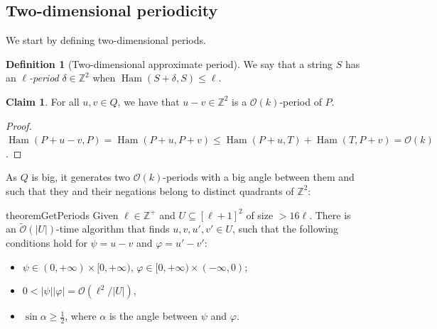\documentclass[11pt, letterpaper]{article}
\theoremstyle{plain}
\theoremstyle{definition}
\newtheorem{definition}{Definition}
\newtheorem{claim}{Claim}
\theoremstyle{remark}
\newcommand{\Z}{\mathbb{Z}}
\renewcommand{\O}{\mathcal{O}}
\newcommand{\tO}{\tilde{\mathcal{O}}}
\renewcommand{\phi}{\varphi}
\DeclareMathOperator*{\Ham}{Ham}
\begin{document}
\subsection{Two-dimensional periodicity} \label{periodicity_section}
We start by defining two-dimensional periods.



\begin{definition}[Two-dimensional approximate period]
We say that a string $S$ has an \emph{$\ell$-period} $\delta \in \Z^2$ when $\Ham(S + \delta, S) \le \ell$.
\end{definition}


\begin{claim} \label{periodicity_lemma}
For all $u, v \in Q$, we have that $u - v \in \Z^2$ is a $\O(k)$-period of $P$.
\end{claim}	
\begin{proof}
$\Ham(P + u - v, P) = \Ham(P + u, P + v) \le \Ham(P + u, T) + \Ham(T,P + v) = \O(k)$.
\end{proof}

As $Q$ is big, it generates two $\O(k)$-periods with a big angle between them and such that they and their negations belong to distinct quadrants of $\Z^2$: 

\begin{restatable*}{theorem}{GetPeriods}\label{get_periods}
Given $\ell \in \Z^+$ and $U \subseteq [\ell + 1]^2$ of size $> 16\ell$. There is an $\tO(|U|)$-time algorithm that finds $u, v, u', v' \in U$, such that the following conditions hold for $\psi = u - v$ and $\phi = u' - v'$:
	\begin{itemize}
		\item $\psi \in (0, +\infty) \times [0, +\infty)$, $\phi \in [0, +\infty) \times (-\infty, 0)$;
		\item $0 < |\psi||\phi| = \O(\ell^2 / |U|)$,
		\item $\sin \alpha \ge \frac{1}{2}$, where $\alpha$ is the angle between $\psi$ and $\phi$.
	\end{itemize}
\end{restatable*}
\end{document}
